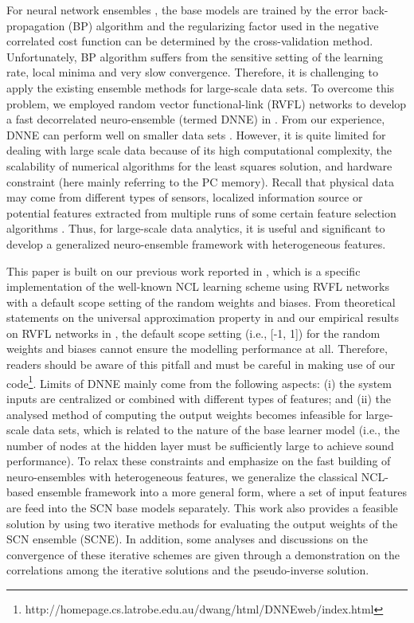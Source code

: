 \documentclass{article}
\begin{document}
For neural network ensembles \cite{chen2009regularized,  igelnik1999ensemble, liu1999ensemble, rosen1996ensemble}, the base models are trained by the error back-propagation (BP) algorithm and the regularizing factor used in the negative correlated cost function can be determined by the cross-validation method. 
Unfortunately, BP algorithm suffers from the sensitive setting of the learning rate, local minima and very slow convergence. 
Therefore, it is challenging to apply the existing ensemble methods for large-scale data sets. 
To overcome this problem,  we employed random vector functional-link (RVFL) networks \cite{igelnik1995stochastic, pao1992functional} to develop a fast decorrelated neuro-ensemble (termed DNNE) in \cite{alhamdoosh2014fast}.
From our experience, DNNE can perform well on smaller data sets \cite{alhamdoosh2014fast,  li2015multisource}.  
However, it is quite limited for dealing with large scale data because of its high computational complexity, the scalability of numerical algorithms for the least squares solution, and hardware constraint (here mainly referring to the PC memory). 
Recall that physical data may come from different types of sensors, localized information source or potential features extracted from multiple runs of some certain feature selection algorithms \cite{cui2016high, hinton2006reducing, lopez2013randomized, nguyen2014multivariate, peng2005feature, reshef2011detecting}.
Thus, for large-scale data analytics, it is useful and significant to develop a generalized neuro-ensemble framework with heterogeneous features. 

This paper is built on our previous work reported in \cite{alhamdoosh2014fast}, which is a specific implementation of the well-known NCL learning scheme using RVFL networks with a default scope setting of the random weights and biases. 
From theoretical statements on the universal approximation property in \cite{igelnik1995stochastic} and our empirical results on RVFL networks in \cite{li2017insights}, the default scope setting (i.e., [-1, 1]) for the random weights and biases cannot ensure the modelling performance at all. 
Therefore, readers should be aware of this pitfall and must be careful in making use of our code\footnote{http://homepage.cs.latrobe.edu.au/dwang/html/DNNEweb/index.html}. Limits of DNNE mainly come from the following aspects: 
(i) the system inputs are centralized or combined with different types of features; 
and (ii) the analysed method of computing the output weights becomes infeasible for large-scale data sets, which is related to the nature of the base learner model (i.e., the number of nodes at the hidden layer must be sufficiently large to achieve sound performance). 
To relax these constraints and emphasize on the fast building of neuro-ensembles with heterogeneous features, we generalize the classical NCL-based ensemble framework into a more general form, where a set of input features are feed into the SCN base models separately. 
This work also provides a feasible solution by using two iterative methods for evaluating the output weights of the SCN ensemble (SCNE). 
In addition, some analyses and discussions on the convergence of these iterative schemes are given through a demonstration on the correlations among the iterative solutions and the pseudo-inverse solution. 
\end{document}
